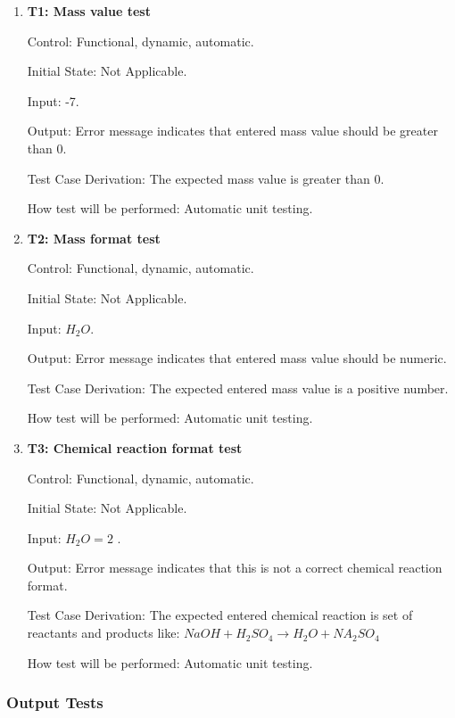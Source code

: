 \documentclass[12pt, titlepage]{article}
\begin{document}
\begin{enumerate}

\item{\bf T1: Mass value test\\}

Control:  Functional, dynamic, automatic.
					
Initial State: Not Applicable.
					
Input:  -7.
					
Output: Error message indicates that entered mass value should be greater than 0.

Test Case Derivation: The expected mass value is greater than 0. 
					
How test will be performed: Automatic unit testing. 

\item{\bf T2: Mass format test\\}

Control:  Functional, dynamic, automatic.
					
Initial State: Not Applicable.
					
Input:  $H_2O$.
					
Output: Error message indicates that entered mass value should be numeric.

Test Case Derivation: The expected entered mass value is a positive number.
					
How test will be performed: Automatic unit testing.

\item{\bf T3: Chemical reaction format test\\}

Control:  Functional, dynamic, automatic.
					
Initial State: Not Applicable.
					
Input: $H_2O = 2$ .
					
Output: Error message indicates that this is not a correct chemical reaction format. 

Test Case Derivation: The expected entered chemical reaction is set of reactants and products like: $NaOH + H_2SO_4 \rightarrow H_2O + NA_2SO_4$
					
How test will be performed: Automatic unit testing.
 
\end{enumerate}

\subsubsection{Output Tests}
\end{document}
